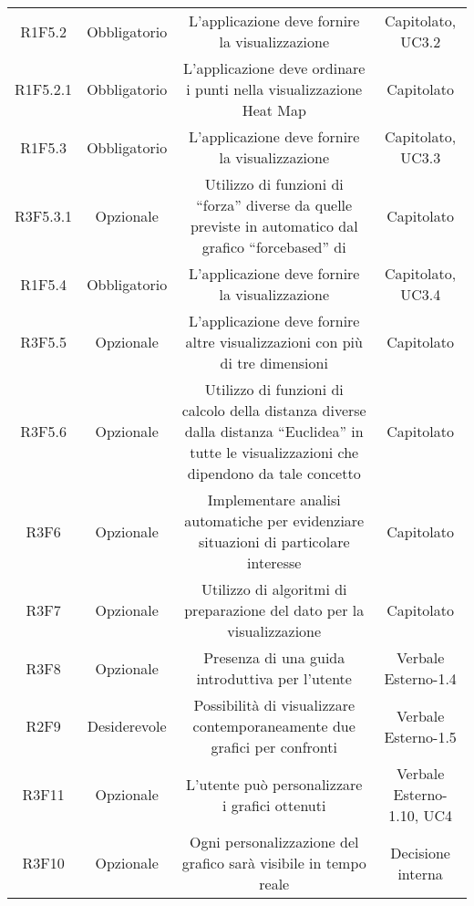 \begin{center}
\begin{longtable}{C{\colA} C{\colB} C{\colC} C{\colA}}
R1F5.2 & Obbligatorio & L'applicazione deve fornire la visualizzazione  & Capitolato, UC3.2\\
R1F5.2.1 & Obbligatorio & L'applicazione deve ordinare i punti nella visualizzazione Heat Map & Capitolato \\
R1F5.3 & Obbligatorio & L'applicazione deve fornire la visualizzazione  & Capitolato, UC3.3\\
R3F5.3.1 & Opzionale & Utilizzo di funzioni di “forza” diverse da quelle previste in automatico dal grafico “forcebased” di  & Capitolato\\
R1F5.4 & Obbligatorio & L'applicazione deve fornire la visualizzazione  & Capitolato, UC3.4 \\
R3F5.5 & Opzionale & L'applicazione deve fornire altre visualizzazioni con più di tre dimensioni & Capitolato\\
R3F5.6 & Opzionale & Utilizzo di funzioni di calcolo della distanza diverse dalla distanza “Euclidea” in tutte le visualizzazioni che dipendono da tale concetto & Capitolato \\
R3F6 & Opzionale & Implementare analisi automatiche per evidenziare situazioni di particolare interesse & Capitolato\\
R3F7 & Opzionale & Utilizzo di algoritmi di preparazione del dato per la visualizzazione & Capitolato\\
R3F8 & Opzionale & Presenza di una guida introduttiva per l'utente & Verbale Esterno-1.4\\
R2F9 & Desiderevole & Possibilità di visualizzare contemporaneamente due grafici per confronti & Verbale Esterno-1.5\\
R3F11 & Opzionale & L'utente può personalizzare i grafici ottenuti & Verbale Esterno-1.10, UC4 \\
R3F10 & Opzionale & Ogni personalizzazione del grafico sarà visibile in tempo reale & Decisione interna \\


\end{longtable}
\end{center}



